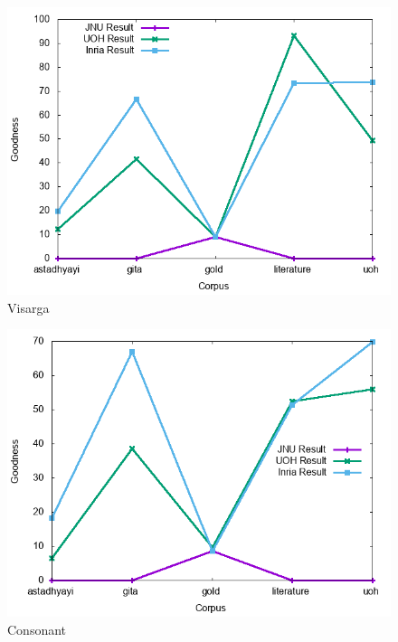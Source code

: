 \documentclass[11pt]{article}
\begin{document}
\begin{figure}[h]
	\center
	\includegraphics[scale=0.34]{images/visarga.png}
	\caption{\label{screen}Visarga}
\end{figure}

\begin{figure}[h]
	\center
	\includegraphics[scale=0.34]{images/consonant.png}
	\caption{\label{screen}Consonant}
\end{figure}
\end{document}
